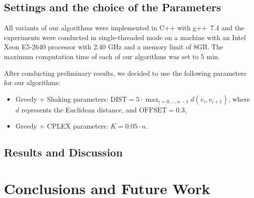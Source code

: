 \documentclass[runningheads,a4paper]{elsarticle}
\begin{document}
     \subsection{Settings and the choice of the Parameters}
      All variants of our algorithms were implemented in C++ with g++~7.4 and the experiments were conducted in single-threaded mode on a machine with an Intel Xeon E5-2640 processor with 2.40 GHz and a memory limit of 8GB. The maximum computation time of each of our algorithms was set to 5 min. 
      
      After conducting preliminary results, we decided to use the following parameters for our algorithms:
      \begin{itemize}
      	\item Greedy + Shaking parameters:  $\mathrm{DIST} = 5 \cdot \max_{i=0,...,n-1} d(v_i, v_{i+1})$, where $d$ represents the Euclidean distance, and $\mathrm{OFFSET} = 0.3$,
        \item Greedy + CPLEX parameters: $K = 0.05 \cdot n$. 
      \end{itemize}
	\subsection{Results and Discussion}

	\section{Conclusions and Future Work}
	
	
	
	
	
	
	
\end{document}
